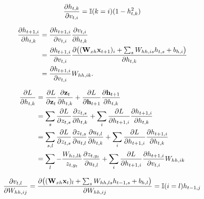 \begin{equation}
    \frac{\partial h_{t,k}}{\partial v_{t,i}} = {\mathbb{I}}(k=i)(1-h_{t,k}^2)
\end{equation}

\begin{equation}
\begin{split}
    \frac{\partial h_{t+1,i}}{\partial h_{t,k}}
        &= \frac{\partial h_{t+1,i}}{\partial v_{t,i}} \frac{\partial v_{t,i}}{\partial h_{t,k}} \\
        &= \frac{\partial h_{t+1,i}}{\partial v_{t,i}} \frac{\partial \big(({\mathbf{W}}_{xh}{\mathbf{x}}_{t+1})_i+\sum_s W_{hh,is}h_{t,s}+b_{h,i}\big)}{\partial h_{t,k}} \\
        &= \frac{\partial h_{t+1,i}}{\partial v_{t,i}} W_{hh,ik}.
\end{split}
\end{equation}

\begin{equation}
\begin{split}
    \frac{\partial L}{\partial h_{t,k}}
        &= \frac{\partial L}{\partial {\mathbf{z}}_t} \frac{\partial {\mathbf{z}}_t}{\partial h_{t,k}} +
            \frac{\partial L}{\partial {\mathbf{h}}_{t+1}} \frac{\partial {\mathbf{h}}_{t+1}}{\partial h_{t,k}} \\
        &= \sum_{s} \frac{\partial L}{\partial z_{t,s}} \frac{\partial z_{t,s}}{\partial h_{t,k}} +
            \sum_i\frac{\partial L}{\partial h_{t+1,i}} \frac{\partial h_{t+1,i}}{\partial h_{t,k}} \\
        &= \sum_{s,l} \frac{\partial L}{\partial z_{t,s}} \frac{\partial z_{t,s}}{\partial u_{t,l}}\frac{\partial u_{t,l}}{\partial h_{t,k}} +
            \sum_i\frac{\partial L}{\partial h_{t+1,i}} \frac{\partial h_{t+1,i}}{\partial h_{t,k}} \\
        &= \sum_{l} -\frac{W_{hz,lk}}{z_{t,{y_t}}} \frac{\partial z_{t,{y_t}}}{\partial u_{t,l}} +
            \sum_i\frac{\partial L}{\partial h_{t+1,i}} \frac{\partial h_{t+1,i}}{\partial v_{t,i}} W_{hh,ik}  \\
\end{split}
\end{equation}

\begin{equation}
    \frac{\partial v_{t,l}}{\partial W_{hh,ij}}
        = \frac{\partial \big(({\mathbf{W}}_{xh}{\mathbf{x}}_t)_l+\sum_s W_{hh,ls}h_{t-1,s}+b_{h,l}\big)}{\partial W_{hh,ij}}
        = {\mathbb{I}}(i=l)h_{t-1,j}
\end{equation}

